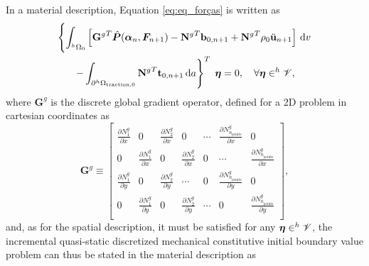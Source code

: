 In a material description, Equation \eqref{eq:eq_forças} is written as
\begin{multline}
     \left\{  \int_{^h\Omega_0}\left[{\mathbf G^g}^T \hat{\bm{P}}(\bm{\alpha}_n, \bm{F}_{n+1})-{\mathbf N^g}^T \mathbf b_{0,n+1} + {\mathbf N^g}^T \rho_0\ddot{\mathbf u}_{n+1} \right]\,\mathrm{d} v \right.\\ \left.   -\int_{\partial ^h\Omega_\text{traction,0}} {\mathbf N^g}^T \mathbf t_{0,n+1}\,\mathrm{d} a\right\}^T\;\bm{\eta} =0,\quad \forall \bm{\eta} \in ^h \mathscr{V},
\end{multline}
where $\mathbf G^g$ is the discrete global gradient operator, defined for a 2D problem in cartesian coordinates as
\begin{equation}
    \mathbf G^g\equiv \left[
    \begin{array}{ccccccc}
         \displaystyle{\frac{\partial N_1^g}{\partial x}} & 0 & \displaystyle{\frac{\partial N_2^g}{\partial x}} & 0 & \cdots &
         \displaystyle{\frac{\partial N_{n_\text{points}}^g}{\partial x}} & 0\\
         0 & \displaystyle{\frac{\partial N_1^g}{\partial x}} & 0 & \displaystyle{\frac{\partial N_2^g}{\partial x}} & 0 & \cdots &
         \displaystyle{\frac{\partial N_{n_\text{points}}^g}{\partial x}}\\
         \displaystyle{\frac{\partial N_1^g}{\partial y}} & 0 & \displaystyle{\frac{\partial N_2^g}{\partial y}} & \cdots &
         0 & \displaystyle{\frac{\partial N_{n_\text{points}}^g}{\partial y}} & 0\\
         0 & \displaystyle{\frac{\partial N_1^g}{\partial y}} & 0 & \displaystyle{\frac{\partial N_2^g}{\partial y}} & \cdots &
         0 & \displaystyle{\frac{\partial N_{n_\text{points}}^g}{\partial y}}\\
    \end{array}
    \right],
\end{equation}
and, as for the spatial description, it must  be satisfied for any $\bm{\eta} \in ^h \mathscr{V}$, the incremental quasi-static discretized mechanical constitutive initial boundary value problem can thus be stated in the material description as

